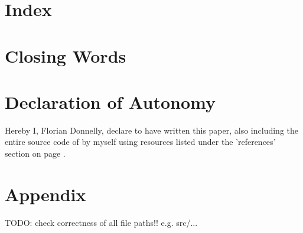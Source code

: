\documentclass[12pt,a4paper,man]{apa7}
\begin{document}
\section{Index}
\section{Closing Words}
\section{Declaration of Autonomy}
Hereby I, Florian Donnelly, declare to have written this paper, also including
the entire source code of \name by myself using resources listed under the
'references' section on page \pageref{bibliography}.

\section{Appendix}

\newpage\printbibliography[heading=bibintoc]\label{bibliography}

TODO: check correctness of all file paths!! e.g. src/...
\end{document}
